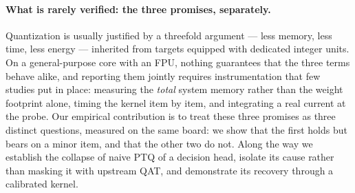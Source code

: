 \paragraph{What is rarely verified: the three promises, separately.} Quantization is usually justified by
a threefold argument --- less memory, less time, less energy --- inherited from targets equipped with
dedicated integer units. On a general-purpose core with an \gls{FPU}, nothing guarantees that the three terms
behave alike, and reporting them jointly requires instrumentation that few studies put in place: measuring
the \emph{total} system memory rather than the weight footprint alone, timing the kernel item by item, and
integrating a real current at the probe. Our empirical contribution is to treat these three promises as
three distinct questions, measured on the same board: we show that the first holds but bears on a minor
item, and that the other two do not. Along the way we establish the collapse of naive PTQ of a decision
head, isolate its cause rather than masking it with upstream QAT, and demonstrate its recovery through a
calibrated kernel.
